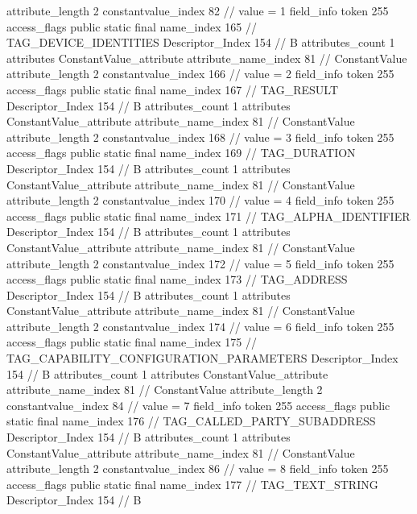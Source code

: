{{{{{{{					attribute_length	2
					constantvalue_index	82		// value = 1
				}
				}
			}
			field_info {
				token	255
				access_flags	public static final
				name_index	165		// TAG_DEVICE_IDENTITIES
				Descriptor_Index	154		// B
				attributes_count	1
				attributes {
				ConstantValue_attribute {
					attribute_name_index	81		// ConstantValue
					attribute_length	2
					constantvalue_index	166		// value = 2
				}
				}
			}
			field_info {
				token	255
				access_flags	public static final
				name_index	167		// TAG_RESULT
				Descriptor_Index	154		// B
				attributes_count	1
				attributes {
				ConstantValue_attribute {
					attribute_name_index	81		// ConstantValue
					attribute_length	2
					constantvalue_index	168		// value = 3
				}
				}
			}
			field_info {
				token	255
				access_flags	public static final
				name_index	169		// TAG_DURATION
				Descriptor_Index	154		// B
				attributes_count	1
				attributes {
				ConstantValue_attribute {
					attribute_name_index	81		// ConstantValue
					attribute_length	2
					constantvalue_index	170		// value = 4
				}
				}
			}
			field_info {
				token	255
				access_flags	public static final
				name_index	171		// TAG_ALPHA_IDENTIFIER
				Descriptor_Index	154		// B
				attributes_count	1
				attributes {
				ConstantValue_attribute {
					attribute_name_index	81		// ConstantValue
					attribute_length	2
					constantvalue_index	172		// value = 5
				}
				}
			}
			field_info {
				token	255
				access_flags	public static final
				name_index	173		// TAG_ADDRESS
				Descriptor_Index	154		// B
				attributes_count	1
				attributes {
				ConstantValue_attribute {
					attribute_name_index	81		// ConstantValue
					attribute_length	2
					constantvalue_index	174		// value = 6
				}
				}
			}
			field_info {
				token	255
				access_flags	public static final
				name_index	175		// TAG_CAPABILITY_CONFIGURATION_PARAMETERS
				Descriptor_Index	154		// B
				attributes_count	1
				attributes {
				ConstantValue_attribute {
					attribute_name_index	81		// ConstantValue
					attribute_length	2
					constantvalue_index	84		// value = 7
				}
				}
			}
			field_info {
				token	255
				access_flags	public static final
				name_index	176		// TAG_CALLED_PARTY_SUBADDRESS
				Descriptor_Index	154		// B
				attributes_count	1
				attributes {
				ConstantValue_attribute {
					attribute_name_index	81		// ConstantValue
					attribute_length	2
					constantvalue_index	86		// value = 8
				}
				}
			}
			field_info {
				token	255
				access_flags	public static final
				name_index	177		// TAG_TEXT_STRING
				Descriptor_Index	154		// B
}}}}}
